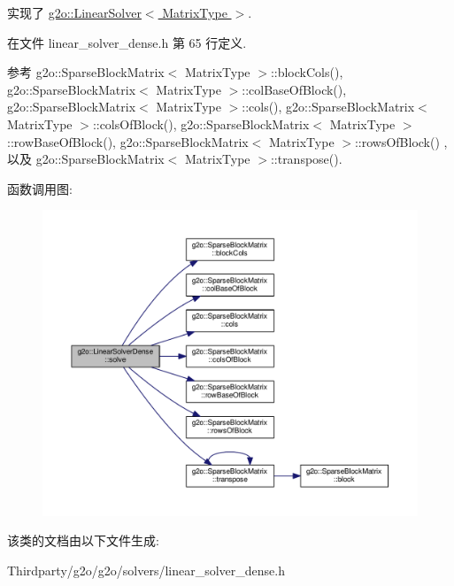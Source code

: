 实现了 \hyperlink{classg2o_1_1LinearSolver_aa44b40826d50203c8ce2ff258c34e030}{g2o\-::\-Linear\-Solver$<$ Matrix\-Type $>$}.



在文件 linear\-\_\-solver\-\_\-dense.\-h 第 65 行定义.



参考 g2o\-::\-Sparse\-Block\-Matrix$<$ Matrix\-Type $>$\-::block\-Cols(), g2o\-::\-Sparse\-Block\-Matrix$<$ Matrix\-Type $>$\-::col\-Base\-Of\-Block(), g2o\-::\-Sparse\-Block\-Matrix$<$ Matrix\-Type $>$\-::cols(), g2o\-::\-Sparse\-Block\-Matrix$<$ Matrix\-Type $>$\-::cols\-Of\-Block(), g2o\-::\-Sparse\-Block\-Matrix$<$ Matrix\-Type $>$\-::row\-Base\-Of\-Block(), g2o\-::\-Sparse\-Block\-Matrix$<$ Matrix\-Type $>$\-::rows\-Of\-Block() , 以及 g2o\-::\-Sparse\-Block\-Matrix$<$ Matrix\-Type $>$\-::transpose().



函数调用图\-:
\nopagebreak
\begin{figure}[H]
\begin{center}
\leavevmode
\includegraphics[width=350pt]{classg2o_1_1LinearSolverDense_a8b6eafa6e53b9f705a4e8eb436eeb403_cgraph}
\end{center}
\end{figure}




该类的文档由以下文件生成\-:\begin{DoxyCompactItemize}
\item 
Thirdparty/g2o/g2o/solvers/linear\-\_\-solver\-\_\-dense.\-h\end{DoxyCompactItemize}
